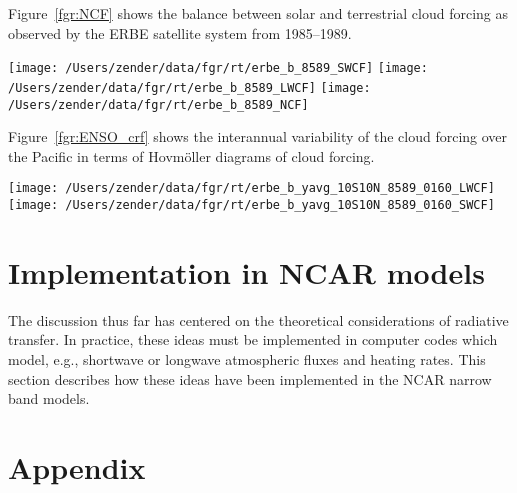 \documentclass[12pt]{article}
\begin{document}
Figure~\ref{fgr:NCF} shows the balance between solar and terrestrial
cloud forcing as observed by the ERBE satellite system from
1985--1989.   
\begin{figure*}
\centering
\texttt{[image: /Users/zender/data/fgr/rt/erbe\_b\_8589\_SWCF]}\vfill
\texttt{[image: /Users/zender/data/fgr/rt/erbe\_b\_8589\_LWCF]}\vfill
\texttt{[image: /Users/zender/data/fgr/rt/erbe\_b\_8589\_NCF]}\vfill
\caption[Climatological Mean Net Cloud Forcing]{
Geographic distribution of 1985--1989 climatological mean 
(a) shortwave cloud forcing $\SWCF$, (b) longwave cloud forcing
$\LWCF$, and (c) net cloud forcing $\NCF$~[\wxmS] from ERBE.
\label{fgr:NCF}}
\end{figure*}

Figure~\ref{fgr:ENSO_crf} shows the interannual variability of the cloud
forcing over the Pacific in terms of Hovm\"{o}ller diagrams of cloud
forcing. 
\begin{figure*}
\centering
\texttt{[image: /Users/zender/data/fgr/rt/erbe\_b\_yavg\_10S10N\_8589\_0160\_LWCF]}%
\texttt{[image: /Users/zender/data/fgr/rt/erbe\_b\_yavg\_10S10N\_8589\_0160\_SWCF]}
\caption[ENSO Cloud Forcing]{
Hovm\"{o}ller diagrams of cloud forcing [\wxmS] in the 
Equatorial Pacific (averaged 10\,\dgrs--10\,\dgrn).
ERBE observations of (a) shortwave cloud forcing $\SWCF$, and 
(b) longwave cloud forcing.
Month~1 is January 1985.  
Contour interval is 10\,\wxmS. 
\label{fgr:ENSO_crf}}
\end{figure*}

\section[Implementation in NCAR models]{Implementation in NCAR models}\label{sxn:mdl}

The discussion thus far has centered on the theoretical considerations
of radiative transfer.
In practice, these ideas must be implemented in computer codes which
model, e.g., shortwave or longwave atmospheric fluxes and heating
rates.
This section describes how these ideas have been implemented in the 
NCAR narrow band models.

\clearpage
\section{Appendix}
\end{document}

